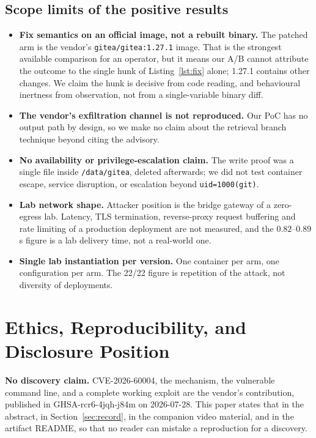 \subsection{Scope limits of the positive results}
\begin{itemize}
\item \textbf{Fix semantics on an official image, not a rebuilt binary.} The
patched arm is the vendor's \texttt{gitea/gitea:1.27.1} image. That is the
strongest available comparison for an operator, but it means our A/B cannot
attribute the outcome to the single hunk of Listing~\ref{lst:fix} alone; 1.27.1
contains other changes. We claim the hunk is decisive from code reading, and
behavioural inertness from observation, not from a single-variable binary
diff.
\item \textbf{The vendor's exfiltration channel is not reproduced.} Our PoC
has no output path by design, so we make no claim about the retrieval branch
technique beyond citing the advisory.
\item \textbf{No availability or privilege-escalation claim.} The write proof
was a single file inside \texttt{/data/gitea}, deleted afterwards; we did not
test container escape, service disruption, or escalation beyond
\texttt{uid=1000(git)}.
\item \textbf{Lab network shape.} Attacker position is the bridge gateway of a
zero-egress lab. Latency, TLS termination, reverse-proxy request buffering and
rate limiting of a production deployment are not measured, and the
$0.82$--$0.89$\,s figure is a lab delivery time, not a real-world one.
\item \textbf{Single lab instantiation per version.} One container per arm,
one configuration per arm. The 22/22 figure is repetition of the attack, not
diversity of deployments.
\end{itemize}

\section{Ethics, Reproducibility, and Disclosure Position}
\label{sec:ethics}

\textbf{No discovery claim.} CVE-2026-60004, the mechanism, the vulnerable
command line, and a complete working exploit are the vendor's contribution,
published in GHSA-rcr6-4jqh-j84m on 2026-07-28. This paper states that in the
abstract, in Section~\ref{sec:record}, in the companion video material, and in
the artifact README, so that no reader can mistake a reproduction for a
discovery.

